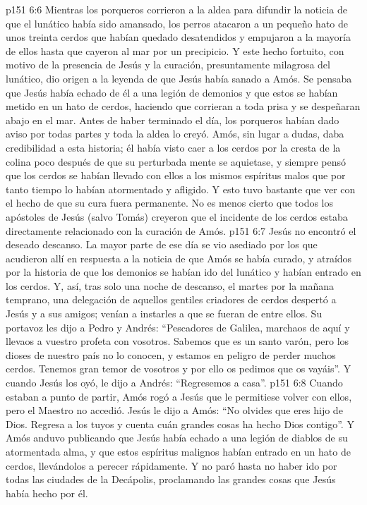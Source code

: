 \vs p151 6:6 Mientras los porqueros corrieron a la aldea para difundir la noticia de que el lunático había sido amansado, los perros atacaron a un pequeño hato de unos treinta cerdos que habían quedado desatendidos y empujaron a la mayoría de ellos hasta que cayeron al mar por un precipicio. Y este hecho fortuito, con motivo de la presencia de Jesús y la curación, presuntamente milagrosa del lunático, dio origen a la leyenda de que Jesús había sanado a Amós. Se pensaba que Jesús había echado de él a una legión de demonios y que estos se habían metido en un hato de cerdos, haciendo que corrieran a toda prisa y se despeñaran abajo en el mar. Antes de haber terminado el día, los porqueros habían dado aviso por todas partes y toda la aldea lo creyó. Amós, sin lugar a dudas, daba credibilidad a esta historia; él había visto caer a los cerdos por la cresta de la colina poco después de que su perturbada mente se aquietase, y siempre pensó que los cerdos se habían llevado con ellos a los mismos espíritus malos que por tanto tiempo lo habían atormentado y afligido. Y esto tuvo bastante que ver con el hecho de que su cura fuera permanente. No es menos cierto que todos los apóstoles de Jesús (salvo Tomás) creyeron que el incidente de los cerdos estaba directamente relacionado con la curación de Amós.
\vs p151 6:7 \pc Jesús no encontró el deseado descanso. La mayor parte de ese día se vio asediado por los que acudieron allí en respuesta a la noticia de que Amós se había curado, y atraídos por la historia de que los demonios se habían ido del lunático y habían entrado en los cerdos. Y, así, tras solo una noche de descanso, el martes por la mañana temprano, una delegación de aquellos gentiles criadores de cerdos despertó a Jesús y a sus amigos; venían a instarles a que se fueran de entre ellos. Su portavoz les dijo a Pedro y Andrés: “Pescadores de Galilea, marchaos de aquí y llevaos a vuestro profeta con vosotros. Sabemos que es un santo varón, pero los dioses de nuestro país no lo conocen, y estamos en peligro de perder muchos cerdos. Tenemos gran temor de vosotros y por ello os pedimos que os vayáis”. Y cuando Jesús los oyó, le dijo a Andrés: “Regresemos a casa”.
\vs p151 6:8 Cuando estaban a punto de partir, Amós rogó a Jesús que le permitiese volver con ellos, pero el Maestro no accedió. Jesús le dijo a Amós: “No olvides que eres hijo de Dios. Regresa a los tuyos y cuenta cuán grandes cosas ha hecho Dios contigo”. Y Amós anduvo publicando que Jesús había echado a una legión de diablos de su atormentada alma, y que estos espíritus malignos habían entrado en un hato de cerdos, llevándolos a perecer rápidamente. Y no paró hasta no haber ido por todas las ciudades de la Decápolis, proclamando las grandes cosas que Jesús había hecho por él.
